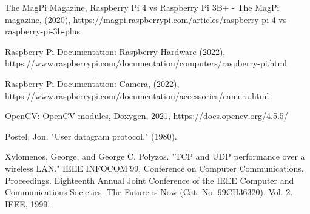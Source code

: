 \documentclass{ctuthesis}
\begin{document}
\begin{thebibliography}{1}
 The MagPi Magazine, Raspberry Pi 4 vs Raspberry Pi 3B+ - The MagPi magazine, (2020), https://magpi.raspberrypi.com/articles/raspberry-pi-4-vs-raspberry-pi-3b-plus

  Raspberry Pi Documentation: Raspberry Hardware (2022), https://www.raspberrypi.com/documentation/computers/raspberry-pi.html

  Raspberry Pi Documentation: Camera, (2022), https://www.raspberrypi.com/documentation/accessories/camera.html
 
  OpenCV: OpenCV modules, Doxygen, 2021, https://docs.opencv.org/4.5.5/
 
  Postel, Jon. "User datagram protocol." (1980).
 
  Xylomenos, George, and George C. Polyzos. "TCP and UDP performance over a wireless LAN." IEEE INFOCOM'99. Conference on Computer Communications. Proceedings. Eighteenth Annual Joint Conference of the IEEE Computer and Communications Societies. The Future is Now (Cat. No. 99CH36320). Vol. 2. IEEE, 1999.



\end{thebibliography}
\end{document}
